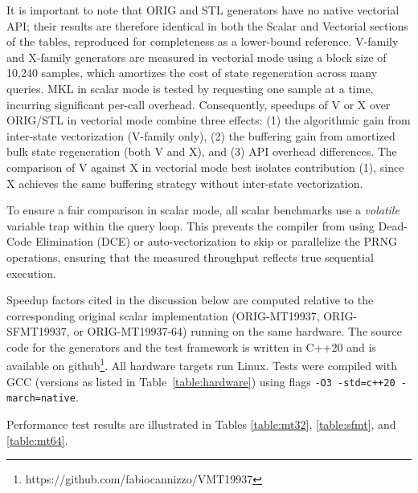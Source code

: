 \documentclass[preprint,1p,times]{elsarticle}
\begin{document}
It is important to note that ORIG and STL generators have no native vectorial API; their results are therefore identical in both the Scalar and Vectorial sections of the tables, reproduced for completeness as a lower-bound reference. V-family and X-family generators are measured in vectorial mode using a block size of 10,240 samples, which amortizes the cost of state regeneration across many queries. MKL in scalar mode is tested by requesting one sample at a time, incurring significant per-call overhead. Consequently, speedups of V or X over ORIG/STL in vectorial mode combine three effects: (1) the algorithmic gain from inter-state vectorization (V-family only), (2) the buffering gain from amortized bulk state regeneration (both V and X), and (3) API overhead differences. The comparison of V against X in vectorial mode best isolates contribution (1), since X achieves the same buffering strategy without inter-state vectorization.

To ensure a fair comparison in scalar mode, all scalar benchmarks use a \textit{volatile} variable trap within the query loop. This prevents the compiler from using Dead-Code Elimination (DCE) or auto-vectorization to skip or parallelize the PRNG operations, ensuring that the measured throughput reflects true sequential execution.

Speedup factors cited in the discussion below are computed relative to the corresponding original scalar implementation (ORIG-MT19937, ORIG-SFMT19937, or ORIG-MT19937-64) running on the same hardware.
The source code for the generators and the test framework is written in C++20 and is available on github\footnote{https://github.com/fabiocannizzo/VMT19937}. All hardware targets run Linux. Tests were compiled with GCC (versions as listed in Table~\ref{table:hardware}) using flags \texttt{-O3 -std=c++20 -march=native}.

Performance test results are illustrated in Tables \ref{table:mt32}, \ref{table:sfmt}, and \ref{table:mt64}.
\end{document}
